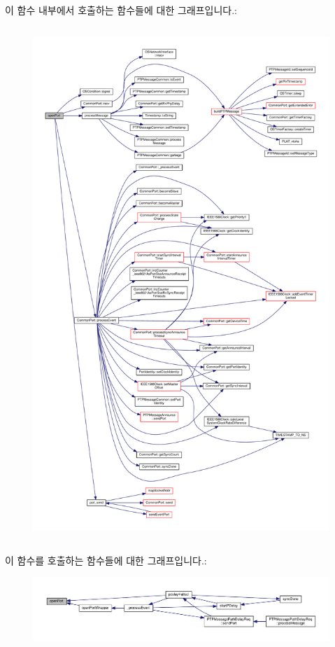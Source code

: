 이 함수 내부에서 호출하는 함수들에 대한 그래프입니다.\+:
\nopagebreak
\begin{figure}[H]
\begin{center}
\leavevmode
\includegraphics[height=550pt]{class_ether_port_a5d1ebb55c2a94cd0ca8c9750998e2c30_cgraph}
\end{center}
\end{figure}




이 함수를 호출하는 함수들에 대한 그래프입니다.\+:
\nopagebreak
\begin{figure}[H]
\begin{center}
\leavevmode
\includegraphics[width=350pt]{class_ether_port_a5d1ebb55c2a94cd0ca8c9750998e2c30_icgraph}
\end{center}
\end{figure}


